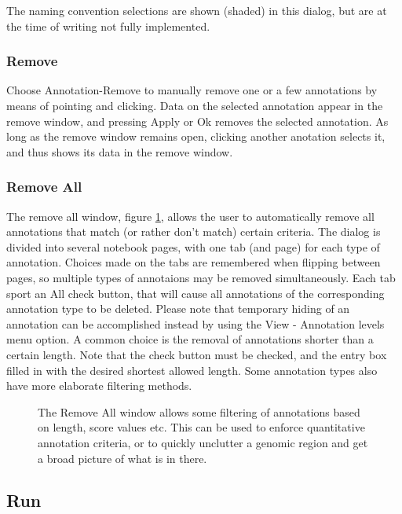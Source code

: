 The naming convention selections are shown (shaded) in this dialog,
but are at the time of writing not fully implemented.

\subsubsection{Remove}
Choose Annotation-Remove to manually remove one or a few annotations by
means of pointing and clicking. Data on the selected annotation
appear in the remove window, and pressing Apply or Ok removes the
selected annotation. As long as the remove window remains open,
clicking another anotation selects it, and thus shows its data in the
remove window.

\subsubsection{Remove All}

The remove all window, figure \ref{fig:GUIremallglim}, allows the user to automatically remove all
annotations that match (or rather don't match) certain criteria. The
dialog is divided into several notebook pages, with one tab (and page)
for each type of annotation. Choices made on the tabs are remembered
when flipping between pages, so multiple types of annotaions may be
removed simultaneously. Each tab sport an All check button, that will
cause all annotations of the corresponding annotation type to be
deleted. Please note that temporary hiding of an annotation can be accomplished instead by
using the View - Annotation levels menu option.
A common choice is the removal of annotations shorter than a certain length. Note that the
check button must be checked, and the entry box filled in with the
desired shortest allowed length. Some annotation types also have more
elaborate filtering methods.

\begin{figure}[htbp]
	\begin{center}
	\end{center}
\caption{The Remove All window allows some filtering of annotations based on length, score values etc. This can be used to enforce quantitative annotation criteria, or to quickly unclutter a genomic region and get a broad picture of what is in there.}
\label{fig:GUIremallglim}
\end{figure}

\subsection{Run}

